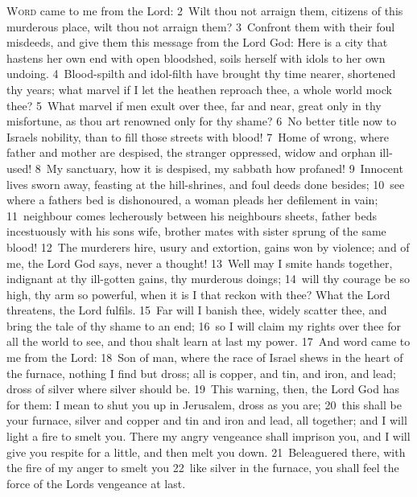 \documentclass[10pt]{book} %
\begin{document}
\lettrine[lines=2]{W}{ord} came to me from the Lord: \textcolor{benred8}{2}~Wilt thou not arraign them, citizens of this murderous place, wilt thou not arraign them? \textcolor{benred8}{3}~Confront them with their foul misdeeds, and give them this message from the Lord God: Here is a city that hastens her own end with open bloodshed, soils herself with idols to her own undoing. \textcolor{benred8}{4}~Blood-spilth and idol-filth have brought thy time nearer, shortened thy years; what marvel if I let the heathen reproach thee, a whole world mock thee? \textcolor{benred8}{5}~What marvel if men exult over thee, far and near, great only in thy misfortune, as thou art renowned only for thy shame? \textcolor{benred8}{6}~No better title now to Israel\textquotesingle s nobility, than to fill those streets with blood! \textcolor{benred8}{7}~Home of wrong, where father and mother are despised, the stranger oppressed, widow and orphan ill-used! \textcolor{benred8}{8}~My sanctuary, how it is despised, my sabbath how profaned! \textcolor{benred8}{9}~Innocent lives sworn away, feasting at the hill-shrines, and foul deeds done besides; \textcolor{benred8}{10}~see where a father\textquotesingle s bed is dishonoured, a woman pleads her defilement in vain; \textcolor{benred8}{11}~neighbour comes lecherously between his neighbour\textquotesingle s sheets, father beds incestuously with his son\textquotesingle s wife, brother mates with sister sprung of the same blood! \textcolor{benred8}{12}~The murderer\textquotesingle s hire, usury and extortion, gains won by violence; and of me, the Lord God says, never a thought! \textcolor{benred8}{13}~Well may I smite hands together, indignant at thy ill-gotten gains, thy murderous doings; \textcolor{benred8}{14}~will thy courage be so high, thy arm so powerful, when it is I that reckon with thee? What the Lord threatens, the Lord fulfils. \textcolor{benred8}{15}~Far will I banish thee, widely scatter thee, and bring the tale of thy shame to an end; \textcolor{benred8}{16}~so I will claim my rights over thee for all the world to see, and thou shalt learn at last my power.
\textcolor{benred8}{17}~And word came to me from the Lord: \textcolor{benred8}{18}~Son of man, where the race of Israel shews in the heart of the furnace, nothing I find but dross; all is copper, and tin, and iron, and lead; dross of silver where silver should be. \textcolor{benred8}{19}~This warning, then, the Lord God has for them: I mean to shut you up in Jerusalem, dross as you are; \textcolor{benred8}{20}~this shall be your furnace, silver and copper and tin and iron and lead, all together; and I will light a fire to smelt you. There my angry vengeance shall imprison you, and I will give you respite for a little, and then melt you down. \textcolor{benred8}{21}~Beleaguered there, with the fire of my anger to smelt you \textcolor{benred8}{22}~like silver in the furnace, you shall feel the force of the Lord\textquotesingle s vengeance at last.
\end{document}
